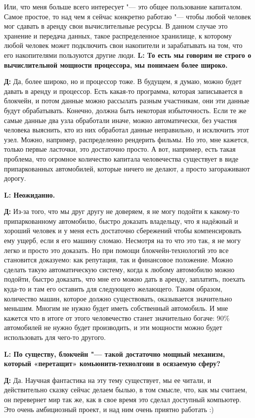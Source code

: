 \documentclass[10pt, a5paper]{article}
\begin{document}
Или, что меня больше всего интересует "--- это общее пользование капиталом. Самое простое, то над чем я сейчас конкретно работаю "--- чтобы любой человек мог сдавать в аренду свои вычислительные ресурсы. В данном случае это хранение и передача данных,  такое распределенное хранилище, к которому любой человек может подключить свои накопители и зарабатывать на том, что его накопителями пользуются другие люди.
{\noindent \bf L: То есть мы говорим не строго о вычислительной мощности процессора, мы понимаем более широко.}

{\noindent \bf Д:} Да, более широко, но и процессор тоже. В будущем, я думаю, можно будет давать в аренду и процессор. Есть какая-то программа, которая записывается в блокчейн, и потом данные можно рассылать разным участникам, они эти данные будут обрабатывать. Конечно, должна быть некоторая избыточность. Если те же  самые данные два узла обработали иначе, можно автоматически, без участия человека выяснить, кто из них обработал данные неправильно, и исключить этот узел. Можно, например, распределенно рендерить фильмы. Но это, мне кажется, только первые ласточки, это достаточно просто. А вот, например, есть такая проблема, что огромное количество капитала человечества существует в виде припаркованных автомобилей, которые ничего не делают, а просто загораживают дорогу.

{\noindent \bf L: Неожиданно.}

{\noindent \bf Д:} Из-за того, что мы друг другу не доверяем, я не могу подойти к какому-то припаркованному автомобилю, быстро доказать владельцу, что я надёжный и хороший человек и у меня есть достаточно сбережений чтобы компенсировать ему ущерб, если я его машину сломаю. Несмотря на то что это так, я не могу легко и просто это доказать. Но при помощи блокчейн-технологий это все становится доказуемо: как репутация, так и финансовое положение. Можно сделать такую автоматическую систему, когда к любому автомобилю можно подойти, быстро доказать, что мне его можно дать в аренду, заплатить, поехать куда-то и там его оставить для следующего желающего. Таким образом, количество машин, которое должно существовать, оказывается значительно меньшим. Многим не нужно будет иметь собственный автомобиль. И мне кажется что в итоге от этого человечество станет значительно богаче:  90\% автомобилей не нужно будет производить, и эти мощности можно будет использовать для чего-то другого.

{\noindent \bf L: По существу, блокчейн "--- такой достаточно мощный механизм, который «перетащит» комьюнити-технолгоии в осязаемую сферу?}

{\noindent \bf Д:} Да. Научная фантастика на эту тему существует, мы ее читали, и действительно сказку сейчас делаем былью, в том смысле, что, как мы  считаем, он перевернет мир так же, как в свое время это сделал доступный компьютер. Это очень амбициозный проект, и над ним очень приятно работать :)

 
\end{document}
